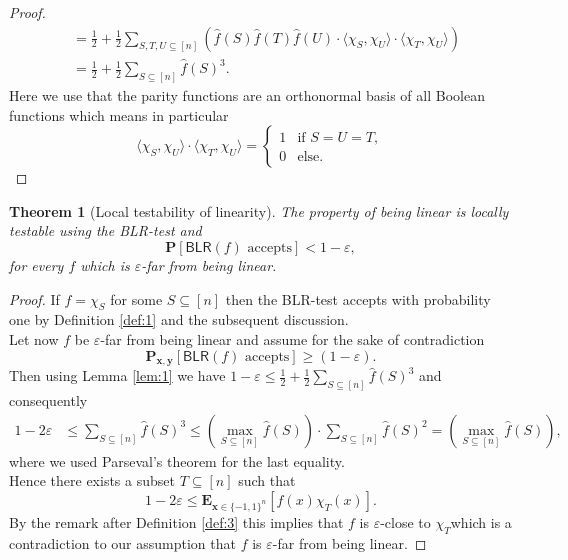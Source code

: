 \documentclass[a4paper]{article}
\newcommand{\prob}{\mathbf{P}}
\newcommand{\expe}{\mathbf{E}}
\newcommand{\nset}{[n]}
\newcommand{\eps}{\varepsilon}
\newcommand{\boldx}{\boldsymbol{x}}
\newcommand{\boldy}{\boldsymbol{y}}
\theoremstyle{plain}
\newtheorem{theorem}{Theorem}
\theoremstyle{definition}
\theoremstyle{remark}
\begin{document}
\begin{proof}
\begin{align}
    &= \frac{1}{2} + \frac{1}{2} \sum_{S,T,U \subseteq \nset}\left(\hat{f}(S) \hat{f}(T) \hat{f}(U) \cdot \langle \chi_S, \chi_U \rangle \cdot \langle \chi_T, \chi_U \rangle \right) \\
    &= \frac{1}{2} + \frac{1}{2} \sum_{S \subseteq \nset} \hat{f}(S)^3. 
  \end{align}
  Here we use that the parity functions are an orthonormal basis of all Boolean
  functions which means in particular
  \[\langle \chi_S, \chi_U \rangle \cdot \langle \chi_T, \chi_U \rangle = 
  \begin{cases}
    1 & \text{if } S = U = T, \\
    0 & \text{else}.
  \end{cases}
\]
\end{proof}


\begin{theorem}[Local testability of linearity] \label{thm:1}
  The property of being linear is locally testable using the
  \textsf{BLR}-test and 
  \[\prob[\textsf{BLR}(f) \text{ accepts}] < 1 - \eps,\]
  for every \(f\) which is \(\eps\)-far from being linear. 
\end{theorem}

\begin{proof}
  If \(f = \chi_S\) for some \(S\subseteq \nset\) then the
  \textsf{BLR}-test accepts with probability one by Definition
  \ref{def:1} and the subsequent discussion.\\ 
  Let now \(f\) be \(\eps\)-far from being linear and assume for the
  sake of contradiction 
  \[\prob_{\boldx,\boldy}\left[\textsf{BLR}(f) \text{ accepts}\right] \geq
  (1-\eps). \]
  Then using Lemma \ref{lem:1} we have \(1-\eps \leq \frac{1}{2} +
  \frac{1}{2} \sum_{S\subseteq \nset}\hat{f}(S)^3\) and consequently
  \begin{align}
    1 - 2\eps &\leq \sum_{S\subseteq \nset}\hat{f}(S)^3 \leq \left(\max_{S\subseteq \nset} \hat{f}(S)\right)\cdot \sum_{S\subseteq \nset}\hat{f}(S)^2 = \left(\max_{S\subseteq \nset} \hat{f}(S)\right),  \label{al:1}
  \end{align}
  where we used Parseval's theorem for the last equality. \\
  Hence there exists a subset \(T \subseteq \nset\) such that 
  \[1 - 2\eps \leq \expe_{\boldx\in\{-1,1\}^n}\left[f(x)\chi_T(x)\right].\]
  By the remark after Definition \ref{def:3} this implies that \(f\)
  is \(\eps\)-close to \(\chi_T\)which is a contradiction to our
  assumption that \(f\) is \(\eps\)-far from being linear. 
\end{proof}
\end{document}

